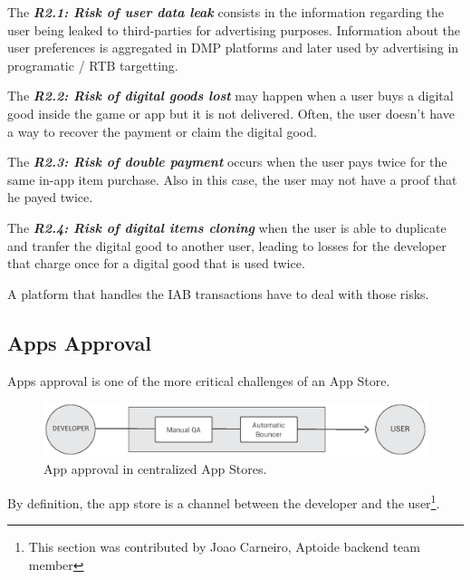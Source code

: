 \begin{tcolorbox}[enhanced jigsaw,sharp corners, drop fuzzy shadow=ShadowColor]

The {\bf\em R2.1: Risk of user data leak} consists in the information regarding the user being leaked to third-parties for advertising purposes. Information about the user preferences is aggregated in DMP platforms and later used by advertising in programatic / RTB targetting.


The {\bf\em R2.2: Risk of digital goods lost} may happen when a user buys a digital good inside the game or app but it is not delivered. Often, the user doesn't have a way to recover the payment or claim the digital good.

The {\bf\em R2.3: Risk of double payment} occurs when the user pays twice for the same in-app item purchase. Also in this case, the user may not have a proof that he payed twice.

The {\bf\em R2.4: Risk of digital items cloning} when the user is able to duplicate and tranfer the digital good to another user, leading to losses for the developer that charge once for a digital good that is used twice.

\end{tcolorbox}

A platform that handles the IAB transactions have to deal with those risks.


\subsection{Apps Approval}


Apps approval is one of the more critical challenges of an App Store.

\begin{figure}[!ht]
\centering
\includegraphics[width=\textwidth]{diagrams/apps_approval_flow.eps}
\caption{App approval in centralized App Stores.}
\label{fig:app_approval_flow}
\end{figure}


By definition, the app store is a channel between the developer and the user\footnote{This section was contributed by Joao Carneiro, Aptoide backend team member}.

